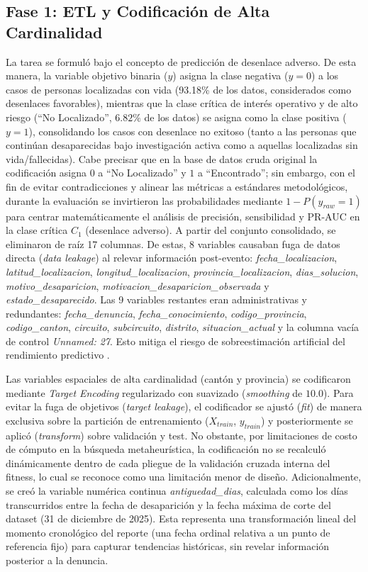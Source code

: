 \documentclass[conference]{IEEEtran}
\begin{document}
\subsection{Fase 1: ETL y Codificación de Alta Cardinalidad}
La tarea se formuló bajo el concepto de predicción de desenlace adverso. De esta manera, la variable objetivo binaria ($y$) asigna la clase negativa ($y = 0$) a los casos de personas localizadas con vida (93.18\% de los datos, considerados como desenlaces favorables), mientras que la clase crítica de interés operativo y de alto riesgo (``No Localizado'', $6.82\%$ de los datos) se asigna como la clase positiva ($y = 1$), consolidando los casos con desenlace no exitoso (tanto a las personas que continúan desaparecidas bajo investigación activa como a aquellas localizadas sin vida/fallecidas). Cabe precisar que en la base de datos cruda original la codificación asigna $0$ a ``No Localizado'' y $1$ a ``Encontrado''; sin embargo, con el fin de evitar contradicciones y alinear las métricas a estándares metodológicos, durante la evaluación se invirtieron las probabilidades mediante $1 - P(y_{raw}=1)$ para centrar matemáticamente el análisis de precisión, sensibilidad y PR-AUC en la clase crítica $C_1$ (desenlace adverso). A partir del conjunto consolidado, se eliminaron de raíz 17 columnas. De estas, 8 variables causaban fuga de datos directa (\textit{data leakage}) al relevar información post-evento: \textit{fecha\_localizacion}, \textit{latitud\_localizacion}, \textit{longitud\_localizacion}, \textit{provincia\_localizacion}, \textit{dias\_solucion}, \textit{motivo\_desaparicion}, \textit{motivacion\_desaparicion\_observada} y \textit{estado\_desaparecido}. Las 9 variables restantes eran administrativas y redundantes: \textit{fecha\_denuncia}, \textit{fecha\_conocimiento}, \textit{codigo\_provincia}, \textit{codigo\_canton}, \textit{circuito}, \textit{subcircuito}, \textit{distrito}, \textit{situacion\_actual} y la columna vacía de control \textit{Unnamed: 27}. Esto mitiga el riesgo de sobreestimación artificial del rendimiento predictivo \cite{kaufman2012leakage}. 

Las variables espaciales de alta cardinalidad (cantón y provincia) se codificaron mediante \textit{Target Encoding} \cite{miccibarreca2001preprocessing} regularizado con suavizado (\textit{smoothing} de $10.0$). Para evitar la fuga de objetivos (\textit{target leakage}), el codificador se ajustó (\textit{fit}) de manera exclusiva sobre la partición de entrenamiento ($X_{train}$, $y_{train}$) y posteriormente se aplicó (\textit{transform}) sobre validación y test. No obstante, por limitaciones de costo de cómputo en la búsqueda metaheurística, la codificación no se recalculó dinámicamente dentro de cada pliegue de la validación cruzada interna del fitness, lo cual se reconoce como una limitación menor de diseño. Adicionalmente, se creó la variable numérica continua \textit{antiguedad\_dias}, calculada como los días transcurridos entre la fecha de desaparición y la fecha máxima de corte del dataset (31 de diciembre de 2025). Esta representa una transformación lineal del momento cronológico del reporte (una fecha ordinal relativa a un punto de referencia fijo) para capturar tendencias históricas, sin revelar información posterior a la denuncia.
\end{document}
